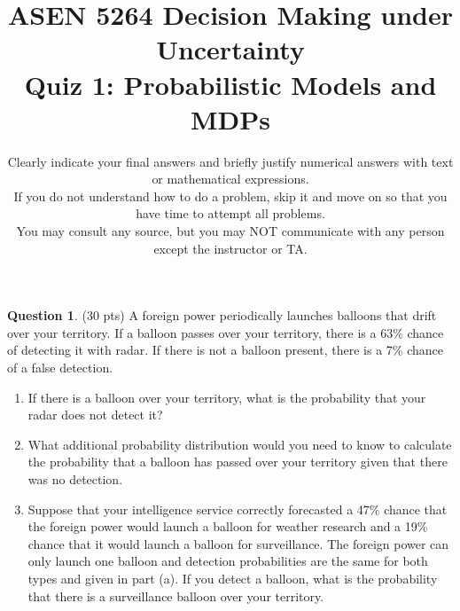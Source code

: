 \documentclass{article}
\title{ASEN 5264 Decision Making under Uncertainty\\
       Quiz 1: Probabilistic Models and MDPs}
\date{\small Clearly indicate your final answers and briefly justify numerical answers with text or mathematical expressions.\\
If you do not understand how to do a problem, skip it and move on so that you have time to attempt all problems.\\
You may consult any source, but you may NOT communicate with any person except the instructor or TA.}
\theoremstyle{definition}
\newtheorem{question}[thm]{Question}
\begin{document}
\maketitle


\begin{question} (30 pts)
    A foreign power periodically launches balloons that drift over your territory. If a balloon passes over your territory, there is a 63\% chance of detecting it with radar. If there is not a balloon present, there is a 7\% chance of a false detection.
    \begin{enumerate}[label=\alph*)]
        \item If there is a balloon over your territory, what is the probability that your radar does not detect it?
        \item What additional probability distribution would you need to know to calculate the probability that a balloon has passed over your territory given that there was no detection.
        \item Suppose that your intelligence service correctly forecasted a 47\% chance that the foreign power would launch a balloon for weather research and a 19\% chance that it would launch a balloon for surveillance. The foreign power can only launch one balloon and detection probabilities are the same for both types and given in part (a). If you detect a balloon, what is the probability that there is a surveillance balloon over your territory. 
    \end{enumerate}
\end{question} 
\end{document}
